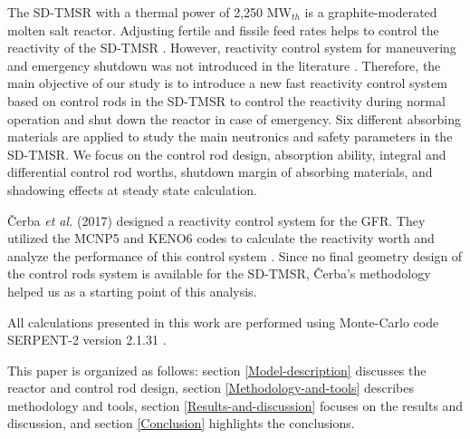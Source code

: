 The \gls{SD-TMSR} with a thermal power of 2,250 MW$_{th}$ 
\cite{ashraf2020whole,li_optimization_2018} is a graphite-moderated 
molten salt reactor. Adjusting fertile and fissile feed rates helps to control the reactivity of 
the SD-TMSR \cite{ashraf2020whole,ashraf2020Strategies,li_optimization_2018}. However, reactivity control system for maneuvering and emergency shutdown was not introduced in the literature \cite{li_optimization_2018,zou2018transition,zhang2020radiotoxicity,jiang2012advanced,zou2018preliminary,ZOU2015114}. Therefore, the main objective of our study is to introduce a new 
fast reactivity control system based on control rods in the \gls{SD-TMSR} to control 
the reactivity during normal operation and shut down the reactor in case of 
emergency. Six different absorbing materials are 
applied to study the main neutronics and safety parameters in the SD-TMSR. We 
focus on the control rod design, absorption ability, integral and differential 
control rod worths, shutdown margin of absorbing materials, and shadowing 
effects at steady state calculation.

\v{C}erba \emph{et al.} (2017) designed a reactivity control system for the 
GFR. They utilized the MCNP5 \cite{briesmeister2000mcnptm} and KENO6 codes 
\cite{petrie1984keno} to calculate the reactivity worth and analyze the 
performance of this control system \cite{vcerba2017optimization}. Since no 
final geometry design of the control rods system is available for the SD-TMSR, 
\v{C}erba's methodology \cite{vcerba2017optimization} helped us as a starting 
point of this analysis.

All calculations presented in this work are performed using Monte-Carlo code SERPENT-2 version 2.1.31 \cite{leppanen2014serpent}.

This paper is organized as follows: section \ref{Model-description} discusses the reactor and control rod design, section \ref{Methodology-and-tools} describes methodology and tools, section \ref{Results-and-discussion} focuses on the results and discussion, and section \ref{Conclusion} highlights the conclusions.